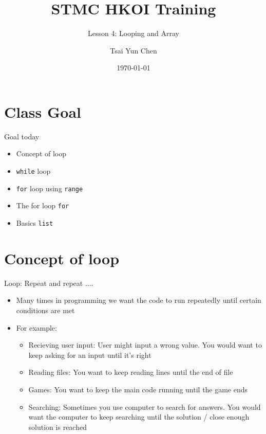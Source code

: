 \documentclass[10pt,xcolor={table,dvipsnames},t]{beamer}
\title[Your Short Title]{STMC HKOI Training}
\subtitle{Lesson 4: Looping and Array}
\author{Tsai Yun Chen}
\date{\today}
\begin{document}
\begin{frame}
  \titlepage
\end{frame}


\section{Class Goal}

\begin{frame}{Goal today}

\begin{itemize}
  \item Concept of loop
  \item \texttt{while} loop
  \item \texttt{for} loop using \texttt{range}
  \item The for loop \texttt{for}
  \item Basics \texttt{list} 
\end{itemize}

\end{frame}


\section{Concept of loop}
\begin{frame}{Loop: Repeat and repeat ....}
    \begin{itemize}
      \item Many times in programming we want the code to run repeatedly until certain conditions are met
      \vspace{2mm}
      \item For example:
      \begin{itemize}
        \item Recieving user input: User might input a wrong value. You would want to keep asking for an input until it's right
        \item Reading files: You want to keep reading lines until the end of file 
        \item Games: You want to keep the main code running until the game ends
        \item Searching: Sometimes you use computer to search for answers. You would want the computer to keep searching until the solution / close enough solution is reached
      \end{itemize}
    \end{itemize}
\end{frame}
\end{document}
